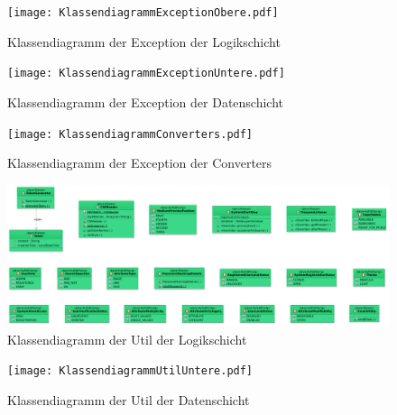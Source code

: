 \documentclass{article}
\begin{document}
\begin{center}
    \begin{figure}[H]
	\hypertarget{ExceptionHandler}{}
        \texttt{[image: KlassendiagrammExceptionObere.pdf]}
        \caption{Klassendiagramm der Exception der Logikschicht }
        \label{fig:Exceptions- Klassendiagramm}
    \end{figure}
\end{center}
\begin{center}
    \begin{figure}[H]
        \texttt{[image: KlassendiagrammExceptionUntere.pdf]}
        \caption{Klassendiagramm der Exception der Datenschicht }
        \label{fig:Dtos- Klassendiagramm}
    \end{figure}
\end{center}

\begin{center}
    \begin{figure}[H]
        \texttt{[image: KlassendiagrammConverters.pdf]}
        \caption{Klassendiagramm der Exception der Converters }
        \label{fig:Dtos- Klassendiagramm}
    \end{figure}
\end{center}

\begin{center}
    \begin{figure}[H]
	\hypertarget{PhaseListener}{}
	\hypertarget{Hash}{}
        \includegraphics[scale=0.4]{KlassendiagrammUtilObere.pdf}
        \caption{Klassendiagramm der Util der Logikschicht }
        \label{fig:Util-logik Klassendiagramm}
    \end{figure}
\end{center}

\begin{center}
    \begin{figure}[H]
	\hypertarget{ConfigReader}{}
        \texttt{[image: KlassendiagrammUtilUntere.pdf]}
        \caption{Klassendiagramm der Util der Datenschicht }
        \label{fig:Util-data Klassendiagramm}
    \end{figure}
\end{center}
\end{document}
